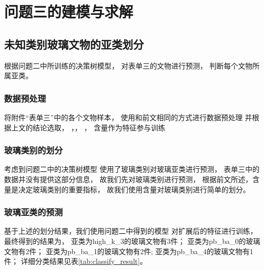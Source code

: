 \documentclass[withoutpreface,bwprint]{cumcmthesis} %
\begin{document}
\section{问题三的建模与求解}
 
\subsection{未知类别玻璃文物的亚类划分}
根据问题二中所训练的决策树模型，
对表单三的文物进行预测，
判断每个文物所属亚类。


\subsubsection{数据预处理}
将附件``表单三''中的各个文物样本，
使用和前文相同的方式进行数据预处理
并根据上文的结论选取， ，， ，
含量作为特征参与训练

\subsubsection{玻璃类别的划分}
考虑到问题二中的决策树模型
使用了玻璃类别对玻璃亚类进行预测，
表单三中的数据并没有提供这部分信息，
故我们先对玻璃类别进行预测，
根据前文所述，含量是决定玻璃类别的重要指标，
故我们使用含量对玻璃类别进行简单的划分。


\subsubsection{玻璃亚类的预测}
基于上述的划分结果，我们使用问题二中得到的模型
对扩展后的特征进行训练，最终得到的结果为，
亚类为high\_k\_3的玻璃文物有3件；
亚类为pb\_ba\_0的玻璃文物有2件；
亚类为pb\_ba\_1的玻璃文物有2件;
亚类为pb\_ba\_4的玻璃文物有1件；
详细分类结果见表\ref{tab:classify_result}。
\end{document}
